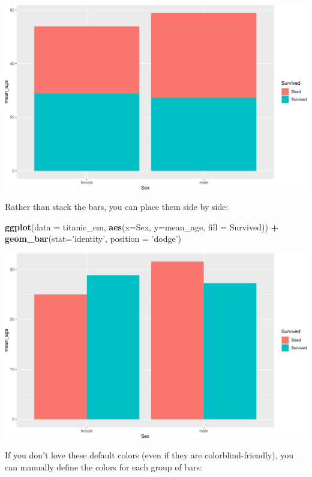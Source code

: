 \documentclass[
]{book}
\newenvironment{Shaded}{\begin{snugshade}}{\end{snugshade}}
\newcommand{\DataTypeTok}[1]{\textcolor[rgb]{0.13,0.29,0.53}{#1}}
\newcommand{\KeywordTok}[1]{\textcolor[rgb]{0.13,0.29,0.53}{\textbf{#1}}}
\newcommand{\NormalTok}[1]{#1}
\newcommand{\OperatorTok}[1]{\textcolor[rgb]{0.81,0.36,0.00}{\textbf{#1}}}
\newcommand{\StringTok}[1]{\textcolor[rgb]{0.31,0.60,0.02}{#1}}
\begin{document}
\includegraphics{figures/unnamed-chunk-259-1.pdf}

Rather than stack the bars, you can place them side by side:

\begin{Shaded}
\begin{Highlighting}[]
\KeywordTok{ggplot}\NormalTok{(}\DataTypeTok{data =}\NormalTok{ titanic_em, }
       \KeywordTok{aes}\NormalTok{(}\DataTypeTok{x=}\NormalTok{Sex, }\DataTypeTok{y=}\NormalTok{mean_age, }\DataTypeTok{fill =}\NormalTok{ Survived)) }\OperatorTok{+}
\StringTok{  }\KeywordTok{geom_bar}\NormalTok{(}\DataTypeTok{stat=}\StringTok{'identity'}\NormalTok{, }\DataTypeTok{position =} \StringTok{'dodge'}\NormalTok{) }
\end{Highlighting}
\end{Shaded}

\includegraphics{figures/unnamed-chunk-260-1.pdf}

If you don't love these default colors (even if they are colorblind-friendly), you can manually define the colors for each group of bars:
\end{document}
